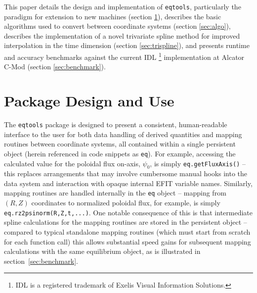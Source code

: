\documentclass[12pt,floatfix,showpacs]{revtex4-1}
\newcommand{\eqtools}{\texttt{eqtools}\xspace}
\begin{document}
This paper details the design and implementation of \eqtools, particularly the paradigm for extension to new machines (section \ref{sec:design}), describes the basic algorithms used to convert between coordinate systems (section \ref{sec:algo}), describes the implementation of a novel trivariate spline method for improved interpolation in the time dimension (section \ref{sec:trispline}), and presents runtime and accuracy benchmarks against the current IDL \footnote{IDL is a registered trademark of Exelis Visual Information Solutions.} implementation at Alcator C-Mod (section \ref{sec:benchmark}).

\section{Package Design and Use}\label{sec:design}

The \eqtools package is designed to present a consistent, human-readable interface to the user for both data handling of derived quantities and mapping routines between coordinate systems, all contained within a single persistent object (herein referenced in code snippets as \verb|eq|).
For example, accessing the calculated value for the poloidal flux on-axis, $\psi_0$, is simply \verb|eq.getFluxAxis()| -- this replaces arrangements that may involve cumbersome manual hooks into the data system and interaction with opaque internal EFIT variable names.
Similarly, mapping routines are handled internally in the \verb|eq| object -- mapping from $(R, Z)$ coordinates to normalized poloidal flux, for example, is simply \verb|eq.rz2psinorm(R,Z,t,...)|.  
One notable consequence of this is that intermediate spline calculations for the mapping routines are stored in the persistent object -- compared to typical standalone mapping routines (which must start from scratch for each function call) this allows substantial speed gains for subsequent mapping calculations with the same equilibrium object, as is illustrated in section~\ref{sec:benchmark}.
\end{document}
